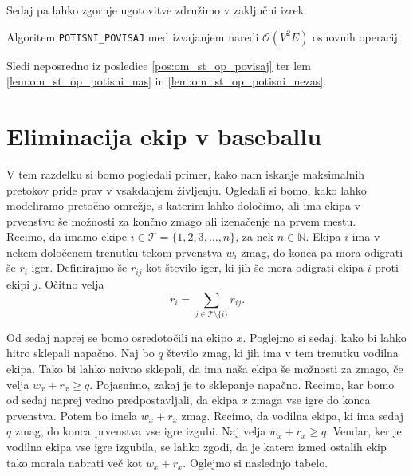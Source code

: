 \documentclass[mat1]{fmfdelo}
\newcommand{\N}{\mathbb N}
\begin{document}
Sedaj pa lahko zgornje ugotovitve združimo v zaključni izrek.

\begin{izrek}
Algoritem \texttt{POTISNI\_POVISAJ} med izvajanjem naredi $\mathcal{O}(V^2E)$ osnovnih operacij.
\end{izrek}

\begin{dokaz}
Sledi neposredno iz posledice \ref{pos:om_st_op_povisaj} ter lem \ref{lem:om_st_op_potisni_nas} in \ref{lem:om_st_op_potisni_nezas}.
\end{dokaz}


\section{Eliminacija ekip v baseballu}

V tem razdelku si bomo pogledali primer, kako nam iskanje maksimalnih pretokov pride prav v vsakdanjem življenju. Ogledali si bomo, kako lahko modeliramo pretočno omrežje, s katerim lahko določimo, ali ima ekipa v prvenstvu še možnosti za končno zmago ali izenačenje na prvem mestu.\\

Recimo, da imamo ekipe $i \in \mathcal{T} = \{ 1, 2, 3, \dotsc, n\}$, za nek $n \in \N$. Ekipa $i$ ima v nekem določenem trenutku tekom prvenstva $w_i$ zmag, do konca pa mora odigrati še $r_i$ iger. Definirajmo še $r_{ij}$ kot število iger, ki jih še mora odigrati ekipa $i$ proti ekipi $j$. Očitno velja \[r_i = \sum_{j \in \mathcal{T}\setminus\{i\}} r_{ij}.\]

Od sedaj naprej se bomo osredotočili na ekipo $x$. Poglejmo si sedaj, kako bi lahko hitro sklepali napačno. Naj bo $q$ število zmag, ki jih ima v tem trenutku vodilna ekipa. Tako bi lahko naivno sklepali, da ima naša ekipa še možnosti za zmago, če velja $w_x + r_x \geq q$. Pojasnimo, zakaj je to sklepanje napačno. Recimo, kar bomo od sedaj naprej vedno predpostavljali, da ekipa $x$ zmaga vse igre do konca prvenstva. Potem bo imela $w_x + r_x$ zmag. Recimo, da vodilna ekipa, ki ima sedaj $q$ zmag, do konca prvenstva vse igre izgubi. Naj velja $w_x + r_x \geq q$. Vendar, ker je vodilna ekipa vse igre izgubila, se lahko zgodi, da je katera izmed ostalih ekip tako morala nabrati več kot $w_x + r_x$. Oglejmo si naslednjo tabelo.
\end{document}
